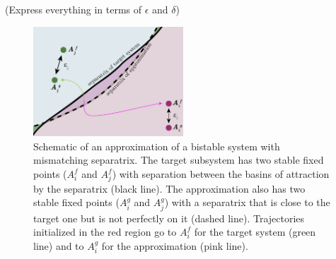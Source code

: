 \documentclass{article}
\newcommand{\ascomment}[1]{\textcolor{ascolor}{(#1)}}
\theoremstyle{definition} \newtheorem{definition}{Definition}
\theoremstyle{remark} \newtheorem{remark}{Remark}
\newcounter{ct}
\begin{document}
\ascomment{Express everything in terms of $\epsilon$ and $\delta$}
\setlength\belowcaptionskip{-1ex}
\begin{figure}
  \centering
  \includegraphics[width=0.5\textwidth]{separatrices}
  \caption{
	Schematic of an approximation of a bistable system with mismatching separatrix. %
	The target subsystem has two stable fixed points ($A_i^f$ and $A_j^f$) with separation between the basins of attraction by the separatrix (black line).
	The approximation also has two stable fixed points ($A_i^g$ and $A_j^g$) with a separatrix that is close to the target one but is not perfectly on it (dashed line).
	Trajectories initialized in the red region go to $A_i^f$ for the target system (green line) and to $A_i^g$ for the approximation (pink line). %
  }\label{fig:separatrices}
\end{figure}
\end{document}
